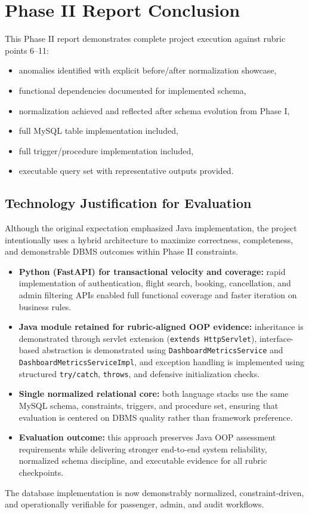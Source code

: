 \documentclass[12pt, a4paper]{article}
\begin{document}
\section{Phase II Report Conclusion}
This Phase II report demonstrates complete project execution against rubric points 6--11:
\begin{itemize}
    \item anomalies identified with explicit before/after normalization showcase,
    \item functional dependencies documented for implemented schema,
    \item normalization achieved and reflected after schema evolution from Phase I,
    \item full MySQL table implementation included,
    \item full trigger/procedure implementation included,
    \item executable query set with representative outputs provided.
\end{itemize}

\subsection{Technology Justification for Evaluation}
Although the original expectation emphasized Java implementation, the project intentionally uses a hybrid architecture to maximize correctness, completeness, and demonstrable DBMS outcomes within Phase II constraints.

\begin{itemize}
    \item \textbf{Python (FastAPI) for transactional velocity and coverage:}
    rapid implementation of authentication, flight search, booking, cancellation, and admin filtering APIs enabled full functional coverage and faster iteration on business rules.

    \item \textbf{Java module retained for rubric-aligned OOP evidence:}
    inheritance is demonstrated through servlet extension (\texttt{extends HttpServlet}), interface-based abstraction is demonstrated using \texttt{DashboardMetricsService} and \texttt{DashboardMetricsServiceImpl}, and exception handling is implemented using structured \texttt{try/catch}, \texttt{throws}, and defensive initialization checks.

    \item \textbf{Single normalized relational core:}
    both language stacks use the same MySQL schema, constraints, triggers, and procedure set, ensuring that evaluation is centered on DBMS quality rather than framework preference.

    \item \textbf{Evaluation outcome:}
    this approach preserves Java OOP assessment requirements while delivering stronger end-to-end system reliability, normalized schema discipline, and executable evidence for all rubric checkpoints.
\end{itemize}

The database implementation is now demonstrably normalized, constraint-driven, and operationally verifiable for passenger, admin, and audit workflows.
\end{document}
